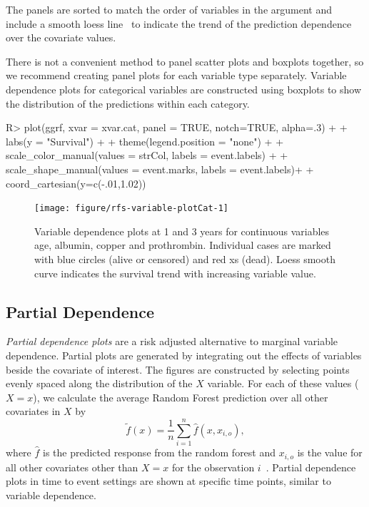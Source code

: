 \documentclass[nojss]{jss}\usepackage[]{graphicx}\usepackage[]{color}
\begin{document}
The panels are sorted to match the order of variables in the  argument and include a smooth loess line~\citep{cleveland:1981,cleveland:1988} to indicate the trend of the prediction dependence over the covariate values.

There is not a convenient method to panel scatter plots and boxplots together, so we recommend creating panel plots for each variable type separately. Variable dependence plots for categorical variables are constructed using boxplots to show the distribution of the predictions within each category. 

\begin{Schunk}
\begin{Sinput}
R> plot(ggrf, xvar = xvar.cat, panel = TRUE, notch=TRUE, alpha=.3) + 
+   labs(y = "Survival") + 
+   theme(legend.position = "none") + 
+   scale_color_manual(values = strCol, labels = event.labels) + 
+   scale_shape_manual(values = event.marks, labels = event.labels)+
+   coord_cartesian(y=c(-.01,1.02))
\end{Sinput}
\begin{figure}[!htpb]

{\centering \texttt{[image: figure/rfs-variable-plotCat-1]} 

}

\caption[Variable dependence plots at 1 and 3 years for continuous variables age, albumin, copper and prothrombin]{Variable dependence plots at 1 and 3 years for continuous variables age, albumin, copper and prothrombin. Individual cases are marked with blue circles (alive or censored) and red xs (dead). Loess smooth curve indicates the survival trend with increasing variable value.\label{fig:variable-plotCat}}
\end{figure}
\end{Schunk}

\subsection{Partial Dependence}\label{S:partialdependence}

\emph{Partial dependence plots} are a risk adjusted alternative to marginal variable dependence. Partial plots are generated by integrating out the effects of variables beside the covariate of interest. The figures are constructed by selecting points evenly spaced along the distribution of the $X$ variable. For each of these values ($X = x$), we calculate the average Random Forest prediction over all other covariates in $X$ by
\begin{equation}
\tilde{f}(x) = \frac{1}{n} \sum_{i = 1}^n \hat{f}(x, x_{i, o}), 
\label{E:partial}
\end{equation}
where $\hat{f}$ is the predicted response from the random forest and $x_{i, o}$ is the value for all other covariates other than $X = x$ for the observation $i$~\citep{Friedman:2000}. Partial dependence plots in time to event settings are shown at specific time points, similar to variable dependence.
\end{document}
